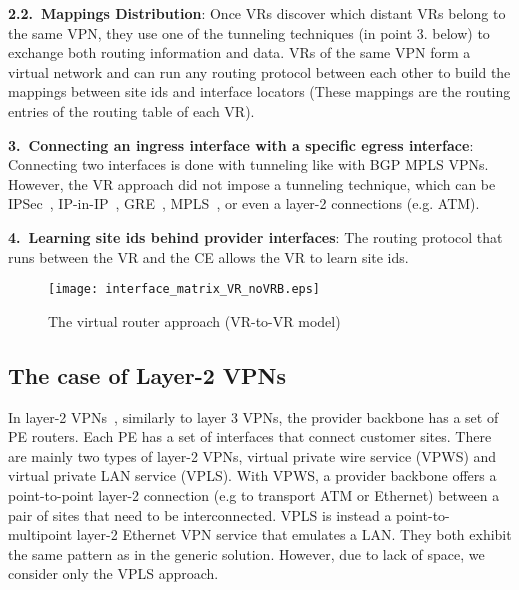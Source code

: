 		\vspace{1mm}\noindent \textbf{2.2.~Mappings Distribution}: Once VRs discover which distant VRs belong to the same VPN, they use one of the tunneling techniques (in point 3. below) to exchange both routing information and data. VRs of the same VPN form a virtual network and can run any routing protocol between each other to build the mappings between site ids and interface locators (These mappings are the routing entries of the routing table of each VR). 


	\vspace{1mm}\noindent \textbf{3.~Connecting an ingress interface with a specific egress interface}: Connecting two interfaces is done with tunneling like with BGP MPLS VPNs. However, the VR approach did not impose a tunneling technique, which can be IPSec~\cite{ipsec}, IP-in-IP~\cite{ipinip}, GRE~\cite{gre}, MPLS~\cite{MPLS_rfc}, or even a layer-2 connections (e.g. ATM). 


	\vspace{1mm}\noindent \textbf{4.~Learning site ids behind provider interfaces}: The routing protocol that runs between the VR and the CE allows the VR to learn site ids.






\begin{figure}[tb]
	\centering
\texttt{[image: interface\_matrix\_VR\_noVRB.eps]}
		\caption{The virtual router approach (VR-to-VR model)}\label{fig:vr1}
\end{figure} 










\subsection{The case of Layer-2 VPNs}
In layer-2 VPNs~\cite{rfc4664}, similarly to layer 3 VPNs, the provider backbone has a set of PE routers. Each PE has a set of interfaces that connect customer sites. 
There are mainly two types of layer-2 VPNs, virtual private wire service (VPWS) and virtual private LAN service (VPLS).
With VPWS, a provider backbone offers a point-to-point layer-2 connection (e.g to transport ATM or Ethernet) between a pair of sites that need to be interconnected. VPLS is instead a point-to-multipoint layer-2 Ethernet VPN service that emulates a LAN.
They both exhibit the same pattern as in the generic solution. However, due to lack of space, we consider only the VPLS approach.











